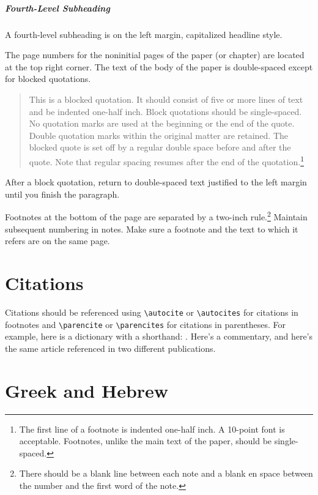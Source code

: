 \documentclass[letterpaper,12pt]{article}
\begin{document}
\subparagraph{Fourth-Level Subheading}

A fourth-level subheading is on the left margin, capitalized headline style.

The page numbers for the noninitial pages of the paper (or chapter) are
located at the top right corner. The text of the body of the paper is
double-spaced except for blocked
quotations.
\begin{quote}
  This is a blocked quotation. It should consist of five or more lines of text
  and be indented one-half inch. Block quotations should be single-spaced. No
  quotation marks are used at the beginning or the end of the quote. Double
  quotation marks within the original matter are retained. The blocked quote
  is set off by a regular double space before and after the quote. Note that
  regular spacing resumes after the end of the quotation.\footnote{The first
  line of a footnote is indented one-half inch. A 10-point font is acceptable.
  Footnotes, unlike the main text of the paper, should be single-spaced.}
\end{quote}
After a block quotation, return to double-spaced text justified to the left
margin until you finish the paragraph.

%
Footnotes at the bottom of the page are separated by a two-inch
rule.\footnote{There should be a blank line between each note and a blank en
space between the number and the first word of the note.} Maintain subsequent
numbering in notes. Make sure a footnote and the text to which it refers are
on the same page.

\section{Citations}

%
Citations should be referenced using \verb+\autocite+ or \verb+\autocites+ for
citations in footnotes and \verb+\parencite+ or \verb+\parencites+ for
citations in parentheses. For example, here is a dictionary with a shorthand:
\parencite{NIDNTT}. Here's a commentary,\autocite{dahood:1965-1970} and here's
the same article referenced in two different
publications.\autocites{freedman:1977,freedman:1980}

\section{Greek
  \ifxetexorluatex
    and Hebrew%
  \fi}
\end{document}
